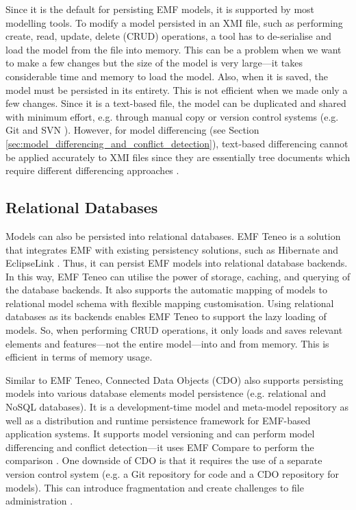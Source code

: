Since it is the default for persisting EMF models, it is supported by most modelling tools. To modify a model persisted in an XMI file, such as performing create, read, update, delete (CRUD) operations, a tool has to de-serialise and load the model from the file into memory. This can be a problem when we want to make a few changes but the size of the model is very large—it takes considerable time and memory to load the model. Also, when it is saved, the model must be persisted in its entirety. This is not efficient when we made only a few changes. Since it is a text-based file, the model can be duplicated and shared with minimum effort, e.g. through manual copy or version control systems (e.g. Git \cite{git2019about} and SVN \cite{apache2019svn}). However, for model differencing (see Section \ref{sec:model_differencing_and_conflict_detection}), text-based differencing \cite{DBLP:journals/algorithmica/Meyers86} cannot be applied accurately to XMI files since they are essentially tree documents which require different differencing approaches \cite{wang2003xdiff}.

\subsection{Relational Databases}
\label{sec:relational_databases}
Models can also be persisted into relational databases. EMF Teneo \cite{eclipse2017teneo} is a solution that integrates EMF with existing persistency solutions, such as Hibernate \cite{hibernate2019hibernateorm} and EclipseLink \cite{eclipse2019eclipselink}. Thus, it can persist EMF models into relational database backends. In this way, EMF Teneo can utilise the power of storage, caching, and querying of the database backends. It also supports the automatic mapping of models to relational model schema with flexible mapping customisation. Using relational databases as its backends enables EMF Teneo to support the lazy loading of models. So, when performing CRUD operations, it only loads and saves relevant elements and features—not the entire model—into and from memory. This is efficient in terms of memory usage.

Similar to EMF Teneo, Connected Data Objects (CDO) \cite{eclipse2019cdo} also supports persisting models into various database elements model persistence (e.g. relational and NoSQL databases). It is a development-time model and meta-model repository as well as a distribution and runtime persistence framework for EMF-based application systems. It supports model versioning and can perform model differencing and conflict detection—it uses EMF Compare \cite{emfcompare2018developer} to perform the comparison \cite{cdo2019emfcompare}. One downside of CDO is that it requires the use of a separate version control system (e.g. a Git repository for code and a CDO repository for models). This can introduce fragmentation and create challenges to file administration \cite{barmpis2014evaluation}.

